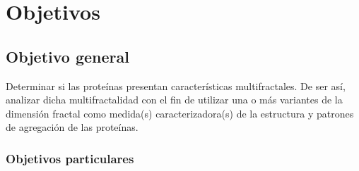 \chapter{Objetivos}
\section{Objetivo general}


Determinar si las prote\'{i}nas presentan caracter\'{i}sticas multifractales. De ser as\'{i}, analizar dicha multifractalidad con el fin de utilizar una o m\'{a}s variantes de la
dimensi\'{o}n fractal como medida(s) caracterizadora(s)
de la estructura y patrones de agregaci\'{o}n de las prote\'{i}nas.



\subsection{Objetivos particulares}

